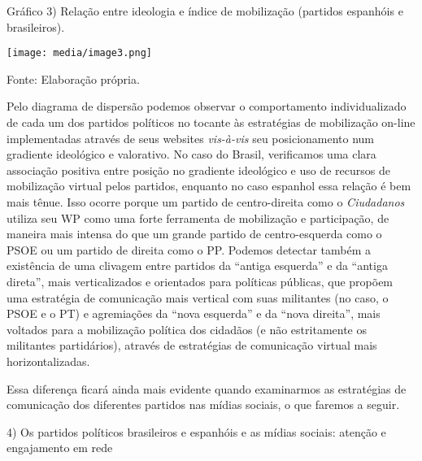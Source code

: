 Gráfico 3) Relação entre ideologia e índice de mobilização (partidos
espanhóis e brasileiros).

\texttt{[image: media/image3.png]}

Fonte: Elaboração própria.

Pelo diagrama de dispersão podemos observar o comportamento
individualizado de cada um dos partidos políticos no tocante às
estratégias de mobilização on-line implementadas através de seus
websites \emph{vis-à-vis} seu posicionamento num gradiente ideológico e
valorativo. No caso do Brasil, verificamos uma clara associação positiva
entre posição no gradiente ideológico e uso de recursos de mobilização
virtual pelos partidos, enquanto no caso espanhol essa relação é bem
mais tênue. Isso ocorre porque um partido de centro-direita como o
\emph{Ciudadanos} utiliza seu WP como uma forte ferramenta de
mobilização e participação, de maneira mais intensa do que um grande
partido de centro-esquerda como o PSOE ou um partido de direita como o
PP. Podemos detectar também a existência de uma clivagem entre partidos
da ``antiga esquerda'' e da ``antiga direta'', mais verticalizados e
orientados para políticas públicas, que propõem uma estratégia de
comunicação mais vertical com suas militantes (no caso, o PSOE e o PT) e
agremiações da ``nova esquerda'' e da ``nova direita'', mais voltados
para a mobilização política dos cidadãos (e não estritamente os
militantes partidários), através de estratégias de comunicação virtual
mais horizontalizadas.

Essa diferença ficará ainda mais evidente quando examinarmos as
estratégias de comunicação dos diferentes partidos nas mídias sociais, o
que faremos a seguir.

4) Os partidos políticos brasileiros e espanhóis e as mídias sociais:
atenção e engajamento em rede

